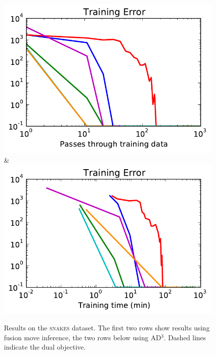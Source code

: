 \begin{figure}
\begin{tabu}
    \includegraphics[width=\linewidth]{evaluation/images/snakes_ad3_loss}&%
    \includegraphics[width=\linewidth]{evaluation/images/snakes_ad3_time_loss}
    \end{tabu}
\caption{%
    Results on the \textsc{snakes} dataset. The first two rows show results using fusion
    move inference, the two rows below using AD$^3$. Dashed lines indicate the dual objective.
}
\end{figure}

